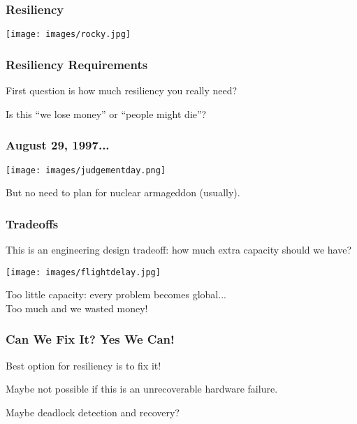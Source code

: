 \begin{frame}
\frametitle{Resiliency}

\begin{center}
	\texttt{[image: images/rocky.jpg]}
\end{center}

\end{frame}

\begin{frame}
\frametitle{Resiliency Requirements}

First question is how much resiliency you really need?


Is this ``we lose money'' or ``people might die''?



\end{frame}

\begin{frame}
\frametitle{August 29, 1997...}

\begin{center}
	\texttt{[image: images/judgementday.png]}
\end{center}

But no need to plan for nuclear armageddon (usually).

\end{frame}

\begin{frame}
\frametitle{Tradeoffs}

This is an engineering design tradeoff: how much extra capacity should we have?

\begin{center}
	\texttt{[image: images/flightdelay.jpg]}
\end{center}

Too little capacity: every problem becomes global...\\
\quad Too much and we wasted money!

\end{frame}

\begin{frame}
\frametitle{Can We Fix It? Yes We Can!}

Best option for resiliency is to fix it!

Maybe not possible if this is an unrecoverable hardware failure.

Maybe deadlock detection and recovery?

\end{frame}

